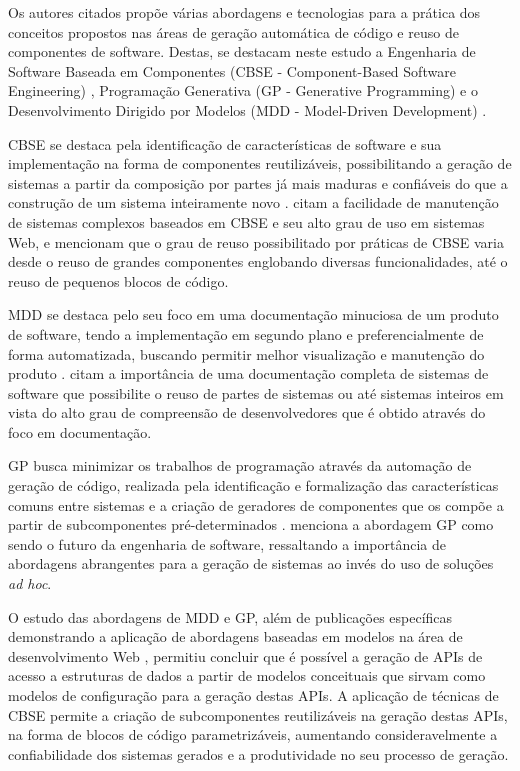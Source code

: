 Os autores citados propõe várias abordagens e tecnologias para a prática dos conceitos propostos nas áreas de geração automática de código e reuso de componentes de software. Destas, se destacam neste estudo a Engenharia de Software Baseada em Componentes (CBSE - Component-Based Software Engineering) \cite{CRNKOVIC:2002a}, Programação Generativa (GP - Generative Programming) \cite{CZARNECKI:2000} e o Desenvolvimento Dirigido por Modelos (MDD - Model-Driven Development) \cite{STAHL:2006}.

CBSE se destaca pela identificação de características de software e sua implementação na forma de componentes reutilizáveis, possibilitando a geração de sistemas a partir da composição por partes já mais maduras e confiáveis do que a construção de um sistema inteiramente novo \cite{CRNKOVIC:2002a}.  citam a facilidade de manutenção de sistemas complexos baseados em CBSE e seu alto grau de uso em sistemas Web, e  mencionam que o grau de reuso possibilitado por práticas de CBSE varia desde o reuso de grandes componentes englobando diversas funcionalidades, até o reuso de pequenos blocos de código.

MDD se destaca pelo seu foco em uma documentação minuciosa de um produto de software, tendo a implementação em segundo plano e preferencialmente de forma automatizada, buscando permitir melhor visualização e manutenção do produto \cite{STAHL:2006}.  citam a importância de uma documentação completa de sistemas de software que possibilite o reuso de partes de sistemas ou até sistemas inteiros em vista do alto grau de compreensão de desenvolvedores que é obtido através do foco em documentação.

GP busca minimizar os trabalhos de programação através da automação de geração de código, realizada pela identificação e formalização das características comuns entre sistemas e a criação de geradores de componentes que os compõe a partir de subcomponentes pré-determinados \cite{CZARNECKI:2000}.  menciona a abordagem GP como sendo o futuro da engenharia de software, ressaltando a importância de abordagens abrangentes para a geração de sistemas ao invés do uso de soluções \textit{ad hoc}.

O estudo das abordagens de MDD e GP, além de publicações específicas demonstrando a aplicação de abordagens baseadas em modelos na área de desenvolvimento Web \cite{POLAK:2015}\cite{VALVERDE:2009}, permitiu concluir que é possível a geração de APIs de acesso a estruturas de dados a partir de modelos conceituais que sirvam como modelos de configuração para a geração destas APIs. A aplicação de técnicas de CBSE permite a criação de subcomponentes reutilizáveis na geração destas APIs, na forma de blocos de código parametrizáveis, aumentando consideravelmente a confiabilidade dos sistemas gerados e a produtividade no seu processo de geração.

